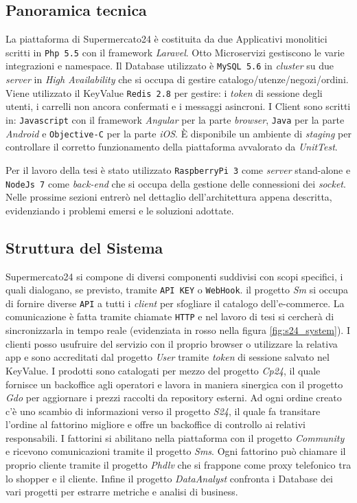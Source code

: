 \subsection{Panoramica tecnica}
\label{subsec:supermercato24Panoramica}

La piattaforma di Supermercato24 è costituita da due Applicativi monolitici scritti in \verb+Php 5.5+ con il framework \textit{Laravel}.
Otto Microservizi gestiscono le varie integrazioni e namespace.
Il Database utilizzato è \verb+MySQL 5.6+ in \textit{cluster} su due \textit{server} in \textit{High Availability} che si occupa di gestire catalogo/utenze/negozi/ordini.
Viene utilizzato il KeyValue \verb+Redis 2.8+ per gestire: i \textit{token} di sessione degli utenti, i carrelli non ancora confermati e i messaggi asincroni.
I Client sono scritti in: \verb+Javascript+ con il framework \textit{Angular} per la parte \textit{browser}, \verb+Java+ per la parte \textit{Android} e \verb+Objective-C+ per la parte \textit{iOS}.
È disponibile un ambiente di \textit{staging} per controllare il corretto funzionamento della piattaforma avvalorato da \textit{UnitTest}.

Per il lavoro della tesi è stato utilizzato \verb+RaspberryPi 3+ come \textit{server} stand-alone e \verb+NodeJs 7+ come \textit{back-end} che si occupa della gestione delle connessioni dei \textit{socket}.
Nelle prossime sezioni entrerò nel dettaglio dell'architettura appena descritta, evidenziando i problemi emersi e le soluzioni adottate.

\subsection{Struttura del Sistema}
\label{subsec:supermercato24StrutturaSistema}

Supermercato24 si compone di diversi componenti suddivisi con scopi specifici, i quali dialogano, se previsto, tramite \verb+API KEY+ o \verb+WebHook+.
il progetto \textit{Sm} si occupa di fornire diverse \verb+API+ a tutti i \textit{client} per sfogliare il catalogo dell'e-commerce.
La comunicazione è fatta tramite chiamate \verb+HTTP+ e nel lavoro di tesi si cercherà di sincronizzarla in tempo reale (evidenziata in rosso nella figura \ref{fig:s24_system}).
I clienti posso usufruire del servizio con il proprio browser o utilizzare la relativa app e sono accreditati dal progetto \textit{User} tramite \textit{token} di sessione salvato nel KeyValue.
I prodotti sono catalogati per mezzo del progetto \textit{Cp24}, il quale fornisce un backoffice agli operatori e lavora in maniera sinergica con il progetto \textit{Gdo} per aggiornare i prezzi raccolti da repository esterni.
Ad ogni ordine creato c'è uno scambio di informazioni verso il progetto \textit{S24}, il quale fa transitare l'ordine al fattorino migliore e offre un backoffice di controllo ai relativi responsabili.
I fattorini si abilitano nella piattaforma con il progetto \textit{Community} e ricevono comunicazioni tramite il progetto \textit{Sms}.
Ogni fattorino può chiamare il proprio cliente tramite il progetto \textit{Phdlv} che si frappone come proxy telefonico tra lo shopper e il cliente.
Infine il progetto \textit{DataAnalyst} confronta i Database dei vari progetti per estrarre metriche e analisi  di business.

